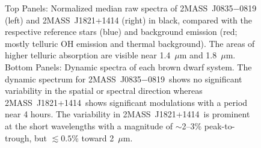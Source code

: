 \documentclass[twocolumn]{aastex6}
\newcommand{\sha}{2MASS~J0835$-$0819}
\newcommand{\shb}{2MASS~J1821+1414}
\begin{document}

\begin{figure}[!t]
\centering
{}
	\caption{Top Panels: Normalized median raw spectra of {\sha} (left) and {\shb} (right) in black, compared with the respective reference stars (blue) and background emission (red; mostly telluric OH emission and thermal background). The areas of higher telluric absorption are visible near 1.4~$\mu$m and 1.8~$\mu$m.  Bottom Panels: Dynamic spectra of each brown dwarf system. The dynamic spectrum for \sha\ shows no significant variability in the spatial or spectral direction whereas \shb\ shows significant modulations with a period near 4 hours.
The variability in \shb\ is prominent at the short wavelengths with a magnitude of $\sim$2--3\% peak-to-trough, but $\lesssim 0.5\%$ toward 2~$\mu$m.}
	\label{fig:specphot}
	\vspace{0.1in}
\end{figure} 
\end{document}

